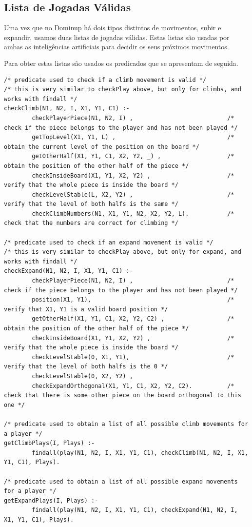 \documentclass[a4paper]{article}
\begin{document}
\subsection{Lista de Jogadas Válidas} 

Uma vez que no Dominup há dois tipos distintos de movimentos, subir e expandir, usamos duas listas de jogadas válidas. Estas listas são usadas por ambas as inteligências artificiais para decidir os seus próximos movimentos.

Para obter estas listas são usados os predicados que se apresentam de seguida.

\begin{lstlisting}
/* predicate used to check if a climb movement is valid */
/* this is very similar to checkPlay above, but only for climbs, and works with findall */
checkClimb(N1, N2, I, X1, Y1, C1) :-                            
        checkPlayerPiece(N1, N2, I) ,                           /* check if the piece belongs to the player and has not been played */
        getTopLevel(X1, Y1, L) ,                                /* obtain the current level of the position on the board */
        getOtherHalf(X1, Y1, C1, X2, Y2, _) ,                   /* obtain the position of the other half of the piece */
        checkInsideBoard(X1, Y1, X2, Y2) ,                      /* verify that the whole piece is inside the board */
        checkLevelStable(L, X2, Y2) ,                           /* verify that the level of both halfs is the same */
        checkClimbNumbers(N1, X1, Y1, N2, X2, Y2, L).           /* check that the numbers are correct for climbing */

/* predicate used to check if an expand movement is valid */
/* this is very similar to checkPlay above, but only for expand, and works with findall */
checkExpand(N1, N2, I, X1, Y1, C1) :- 
        checkPlayerPiece(N1, N2, I) ,                           /* check if the piece belongs to the player and has not been played */
        position(X1, Y1),                                       /* verify that X1, Y1 is a valid board position */
        getOtherHalf(X1, Y1, C1, X2, Y2, C2) ,                  /* obtain the position of the other half of the piece */ 
        checkInsideBoard(X1, Y1, X2, Y2) ,                      /* verify that the whole piece is inside the board */    
        checkLevelStable(0, X1, Y1),                            /* verify that the level of both halfs is the 0 */    
        checkLevelStable(0, X2, Y2) , 
        checkExpandOrthogonal(X1, Y1, C1, X2, Y2, C2).          /* check that there is some other piece on the board orthogonal to this one */

/* predicate used to obtain a list of all possible climb movements for a player */
getClimbPlays(I, Plays) :- 
        findall(play(N1, N2, I, X1, Y1, C1), checkClimb(N1, N2, I, X1, Y1, C1), Plays).

/* predicate used to obtain a list of all possible expand movements for a player */
getExpandPlays(I, Plays) :- 
        findall(play(N1, N2, I, X1, Y1, C1), checkExpand(N1, N2, I, X1, Y1, C1), Plays).
\end{lstlisting}
\end{document}
